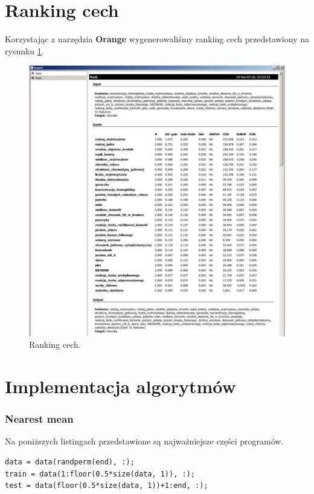 \documentclass[11pt, a4paper, titlepage]{report}
\begin{document}
\section{Ranking cech}
\label{sec:Ranking cech}
Korzystając z narzędzia \textbf{Orange} wygenerowaliśmy ranking cech przedstawiony na rysunku \ref{fig:ranking}.
\newpage
\begin{figure}[h]
  \label{fig:ranking}
  \includegraphics[scale=0.5]{obrazki/ranking}
  \caption{Ranking cech.}
\end{figure}

\section{Implementacja algorytmów}
\label{sec:Implementacja algorytmów}
\subsubsection{Nearest mean}
\label{subs:Nearest mean}
Na poniższych listingach przedstawione są najważniejsze części programów.

\begin{lstlisting}[label={lst:podzial},caption={Podział danych na zbiór uczący i testowy.}]
data = data(randperm(end), :);
train = data(1:floor(0.5*size(data, 1)), :);
test = data(floor(0.5*size(data, 1))+1:end, :);
\end{lstlisting}
\end{document}
